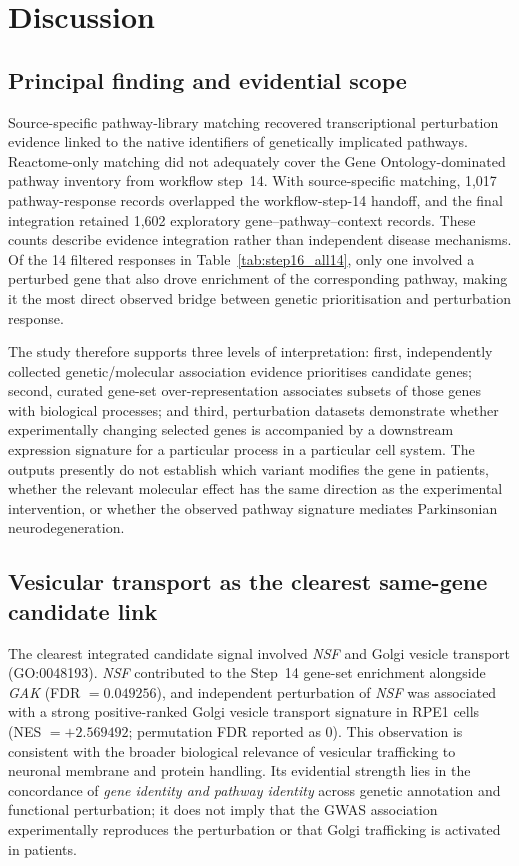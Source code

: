 \documentclass[11pt,a4paper]{article}
\begin{document}
\section{Discussion}
\label{sec:gwas2mech_mechanistic_discussion}
\subsection{Principal finding and evidential scope}
\label{subsec:discussion_main}
Source-specific pathway-library matching recovered transcriptional perturbation evidence linked to the native identifiers of genetically implicated pathways. Reactome-only matching did not adequately cover the Gene Ontology-dominated pathway inventory from workflow step~14. With source-specific matching, 1,017 pathway-response records overlapped the workflow-step-14 handoff, and the final integration retained 1,602 exploratory gene--pathway--context records. These counts describe evidence integration rather than independent disease mechanisms. Of the 14 filtered responses in Table~\ref{tab:step16_all14}, only one involved a perturbed gene that also drove enrichment of the corresponding pathway, making it the most direct observed bridge between genetic prioritisation and perturbation response.

The study therefore supports three levels of interpretation: first, independently collected genetic/molecular association evidence prioritises candidate genes; second, curated gene-set over-representation associates subsets of those genes with biological processes; and third, perturbation datasets demonstrate whether experimentally changing selected genes is accompanied by a downstream expression signature for a particular process in a particular cell system. The outputs presently do not establish which variant modifies the gene in patients, whether the relevant molecular effect has the same direction as the experimental intervention, or whether the observed pathway signature mediates Parkinsonian neurodegeneration.

\subsection{Vesicular transport as the clearest same-gene candidate link}
\label{subsec:discussion_nsf}
The clearest integrated candidate signal involved \textit{NSF} and Golgi vesicle transport (GO:0048193). \textit{NSF} contributed to the Step~14 gene-set enrichment alongside \textit{GAK} (FDR $=0.049256$), and independent perturbation of \textit{NSF} was associated with a strong positive-ranked Golgi vesicle transport signature in RPE1 cells (NES $=+2.569492$; permutation FDR reported as 0). This observation is consistent with the broader biological relevance of vesicular trafficking to neuronal membrane and protein handling. Its evidential strength lies in the concordance of \emph{gene identity and pathway identity} across genetic annotation and functional perturbation; it does not imply that the GWAS association experimentally reproduces the perturbation or that Golgi trafficking is activated in patients.
\end{document}

